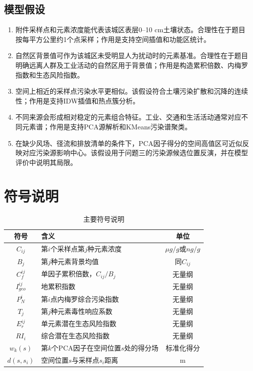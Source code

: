 \documentclass[UTF8,a4paper,12pt]{ctexart}
\begin{document}
\subsection{模型假设}
\begin{enumerate}[label=假设\arabic*：]
\item 附件采样点和元素浓度能代表该城区表层0--10 cm土壤状态。合理性在于题目按每平方公里约1个点采样；作用是支持空间插值和功能区统计。
\item 自然区背景值可作为该城区未受明显人为扰动时的元素基准。合理性在于题目明确远离人群及工业活动的自然区用于背景值；作用是构造累积倍数、内梅罗指数和生态风险指数。
\item 空间上相近的采样点污染水平更相似。该假设符合土壤污染扩散和沉降的连续性；作用是支持IDW插值和热点簇分析。
\item 不同来源会形成相对稳定的元素组合特征。工业、交通和生活活动通常对应不同元素谱；作用是支持PCA源解析和KMeans污染谱聚类。
\item 在缺少风场、径流和排放清单的条件下，PCA因子得分的空间高值区可近似反映对应污染源影响中心。该假设用于问题三的污染源候选位置反演，并在模型评价中说明其局限。
\end{enumerate}

\section{符号说明}
\begin{table}[H]
\centering
\caption{主要符号说明}
\begin{tabular}{clc}
\toprule
符号 & 含义 & 单位 \\
\midrule
$C_{ij}$ & 第$i$个采样点第$j$种元素浓度 & $\mu g/g$或$ng/g$ \\
$B_j$ & 第$j$种元素背景均值 & 同$C_{ij}$ \\
$C_f^{ij}$ & 单因子累积倍数，$C_{ij}/B_j$ & 无量纲 \\
$I_{geo}^{ij}$ & 地累积指数 & 无量纲 \\
$P_N^i$ & 第$i$点内梅罗综合污染指数 & 无量纲 \\
$T_j$ & 第$j$种元素毒性响应系数 & 无量纲 \\
$E_r^{ij}$ & 单元素潜在生态风险指数 & 无量纲 \\
$RI_i$ & 综合潜在生态风险指数 & 无量纲 \\
$w_k(s)$ & 第$k$个PCA因子在空间位置$s$处的得分场 & 标准化得分 \\
$d(s,s_i)$ & 空间位置$s$与采样点$s_i$距离 & m \\
\bottomrule
\end{tabular}
\end{table}
\end{document}
